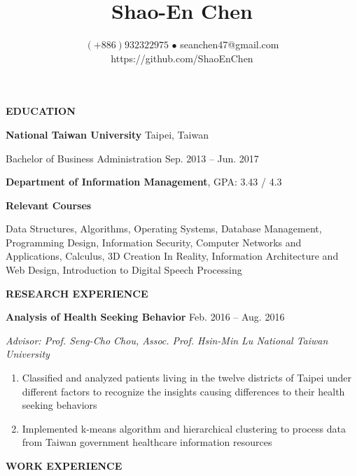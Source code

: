 \documentclass[12pt]{article}
\title{\vspace{-0.8in}Shao-En Chen}
\author{
	$(\texttt{+}886) 932322975$ $\bullet$ seanchen47@gmail.com
	\\https://github.com/ShaoEnChen
}
\date{}
\begin{document}
\maketitle

\textbf{\large{\uppercase{Education}}}
\hrulefill{}

	\vspace{0.5em}

	\textbf{National Taiwan University} \hfill Taipei, Taiwan

	Bachelor of Business Administration \hfill Sep. 2013 -- Jun. 2017

	\textbf{Department of Information Management}, GPA: 3.43 / 4.3

	\textbf{Relevant Courses}

	Data Structures, Algorithms, Operating Systems, Database Management, Programming Design, Information Security, Computer Networks and Applications, Calculus, 3D Creation In Reality, Information Architecture and Web Design, Introduction to Digital Speech Processing

	\vspace{1em}

\textbf{\large{\uppercase{Research Experience}}}
\hrulefill{}

	\vspace{0.5em}

	\textbf{Analysis of Health Seeking Behavior} \hfill Feb. 2016 -- Aug. 2016

	\textit{Advisor: Prof. Seng-Cho Chou, Assoc. Prof. Hsin-Min Lu \hfill National Taiwan University}

	\begin{enumerate}

		\item Classified and analyzed patients living in the twelve districts of Taipei under different factors to recognize the insights causing differences to their health seeking behaviors

		\item Implemented k-means algorithm and hierarchical clustering to process data from Taiwan government healthcare information resources

	\end{enumerate}

	\vspace{1em}

\textbf{\large{\uppercase{Work Experience}}}
\hrulefill{}

	\vspace{0.5em}
\end{document}
